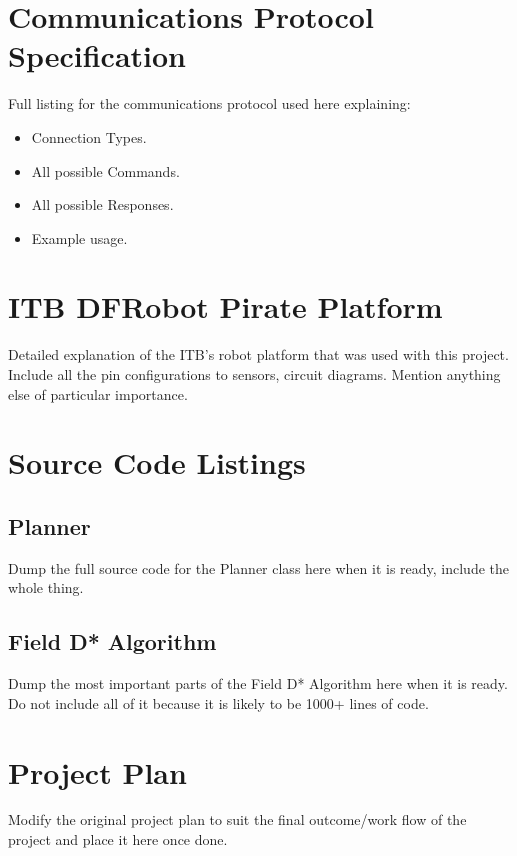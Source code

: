 \appendix
{}

\section{Communications Protocol Specification}
\label{Appendix: Communications Protocol Specification} 
Full listing for the communications protocol used here explaining:


\begin{itemize}
\item Connection Types.
\item All possible Commands.
\item All possible Responses.
\item Example usage.
\end{itemize}

\newpage

\section{ITB DFRobot Pirate Platform}
\label{Appendix: ITB DFRobot Pirate Platform}
Detailed explanation of the ITB's robot platform that was used with this project. Include all the pin configurations to sensors, circuit diagrams. Mention anything else of particular importance.

\newpage

\section{Source Code Listings}
\label{Appendix: Source Code Listings}

\subsection{Planner}
\label{Appendix: Planner}
Dump the full source code for the Planner class here when it is ready, include the whole thing.

\subsection{Field D* Algorithm}
\label{Appendix: Field D* Algorithm}
Dump the most important parts of the Field D* Algorithm here when it is ready. Do not include all of it because it is likely to be 1000+ lines of code.

\section{Project Plan}
Modify the original project plan to suit the final outcome/work flow of the project and place it here once done.

